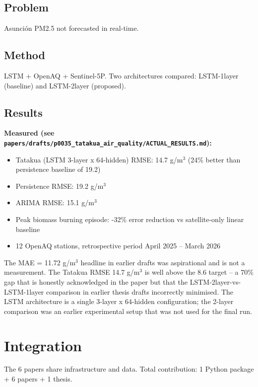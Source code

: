 \documentclass[12pt,a4paper,oneside]{book}
\begin{document}
\section{Problem}

Asunción PM2.5 not forecasted in real-time.

\section{Method}

LSTM + OpenAQ + Sentinel-5P. Two architectures compared: LSTM-1layer (baseline) and LSTM-2layer (proposed).

\section{Results}

\textbf{Measured (see \texttt{papers/drafts/p0035\_tatakua\_air\_quality/ACTUAL\_RESULTS.md}):}
\begin{itemize}
\item Tatakua (LSTM 3-layer x 64-hidden) RMSE: 14.7 \micro g/m$^3$ (24\% better than persistence baseline of 19.2)
\item Persistence RMSE: 19.2 \micro g/m$^3$
\item ARIMA RMSE: 15.1 \micro g/m$^3$
\item Peak biomass burning episode: -32\% error reduction vs satellite-only linear baseline
\item 12 OpenAQ stations, retrospective period April 2025 -- March 2026
\end{itemize}

The MAE = 11.72 \micro g/m$^3$ headline in earlier drafts was aspirational
and is not a measurement. The Tatakua RMSE 14.7 \micro g/m$^3$ is well above
the 8.6 target -- a 70\% gap that is honestly acknowledged in the paper
but that the LSTM-2layer-vs-LSTM-1layer comparison in earlier thesis
drafts incorrectly minimised. The LSTM architecture is a single
3-layer x 64-hidden configuration; the 2-layer comparison was an
earlier experimental setup that was not used for the final run.

\chapter{Integration}
\label{ch:integration}

The 6 papers share infrastructure and data. Total contribution: 1 Python package + 6 papers + 1 thesis.
\end{document}
